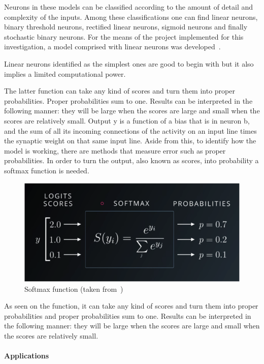 Neurons in these models can be classified according to the amount of detail and complexity of the inputs. Among these classifications one can find linear neurons, binary threshold neurons, rectified linear neurons, sigmoid neurons and finally stochastic binary neurons. For the means of the project implemented for this investigation, a model comprised with linear neurons was developed~\cite{hinton13}. 

Linear neurons identified as the simplest ones are good to begin with but it also implies a limited computational power.

The latter function can take any kind of scores and turn them into proper probabilities. Proper probabilities sum to one.  Results can be interpreted in the following manner: they will be large when the scores are large and small when the scores are relatively small. 
Output y is a function of a bias that is in neuron b, and the sum of all its incoming connections of the activity on an input line times the synaptic weight on that same input line. Aside from this, to identify how the model is working, there are methods that measure error such as proper probabilities. In order to turn the output, also known as scores, into probability a softmax function is needed.

\begin{figure}[htbp]
  \centering
  \includegraphics[width=\textwidth]{images/softmax}
  \caption{ Softmax function (taken from~\cite{hinton13}) }
  \label{fig:softmax}
\end{figure}

As seen on the  function, it can take any kind of scores and turn them into proper probabilities and proper probabilities sum to one.  Results can be interpreted in the following manner: they will be large when the scores are large and small when the scores are relatively small. 


\paragraph{Applications}




\endinput

